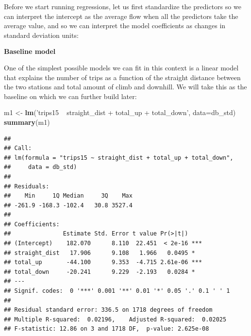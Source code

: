 \documentclass[
]{book}
\newenvironment{Shaded}{\begin{snugshade}}{\end{snugshade}}
\newcommand{\CommentTok}[1]{\textcolor[rgb]{0.56,0.35,0.01}{\textit{#1}}}
\newcommand{\DataTypeTok}[1]{\textcolor[rgb]{0.13,0.29,0.53}{#1}}
\newcommand{\KeywordTok}[1]{\textcolor[rgb]{0.13,0.29,0.53}{\textbf{#1}}}
\newcommand{\NormalTok}[1]{#1}
\newcommand{\OperatorTok}[1]{\textcolor[rgb]{0.81,0.36,0.00}{\textbf{#1}}}
\newcommand{\StringTok}[1]{\textcolor[rgb]{0.31,0.60,0.02}{#1}}
\begin{document}
Before we start running regressions, let us first standardize the predictors so we can interpret the intercept as the average flow when all the predictors take the average value, and so we can interpret the model coefficients as changes in standard deviation units:

\begin{Shaded}
\end{Shaded}

\textbf{Baseline model}

One of the simplest possible models we can fit in this context is a linear model that explains the number of trips as a function of the straight distance between the two stations and total amount of climb and downhill. We will take this as the baseline on which we can further build later:

\begin{Shaded}
\begin{Highlighting}[]
\NormalTok{m1 <-}\StringTok{ }\KeywordTok{lm}\NormalTok{(}\StringTok{'trips15 ~ straight_dist + total_up + total_down'}\NormalTok{, }\DataTypeTok{data=}\NormalTok{db_std)}
\KeywordTok{summary}\NormalTok{(m1)}
\end{Highlighting}
\end{Shaded}

\begin{verbatim}
## 
## Call:
## lm(formula = "trips15 ~ straight_dist + total_up + total_down", 
##     data = db_std)
## 
## Residuals:
##    Min     1Q Median     3Q    Max 
## -261.9 -168.3 -102.4   30.8 3527.4 
## 
## Coefficients:
##               Estimate Std. Error t value Pr(>|t|)    
## (Intercept)    182.070      8.110  22.451  < 2e-16 ***
## straight_dist   17.906      9.108   1.966   0.0495 *  
## total_up       -44.100      9.353  -4.715 2.61e-06 ***
## total_down     -20.241      9.229  -2.193   0.0284 *  
## ---
## Signif. codes:  0 '***' 0.001 '**' 0.01 '*' 0.05 '.' 0.1 ' ' 1
## 
## Residual standard error: 336.5 on 1718 degrees of freedom
## Multiple R-squared:  0.02196,    Adjusted R-squared:  0.02025 
## F-statistic: 12.86 on 3 and 1718 DF,  p-value: 2.625e-08
\end{verbatim}
\end{document}
